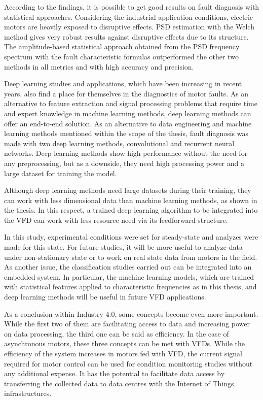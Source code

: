 According to the findings, it is possible to get good results on fault diagnosis with statistical approaches. Considering the industrial application conditions,  electric motors are heavily exposed to disruptive effects. PSD estimation with the Welch method gives very robust results against disruptive effects due to its structure. The amplitude-based statistical approach obtained from the PSD frequency spectrum with the fault characteristic formulas outperformed the other two methods in all metrics and with high accuracy and precision.

Deep learning studies and applications, which have been increasing in recent years, also find a place for themselves in the diagnostics of motor faults. As an alternative to feature extraction and signal processing problems that require time and expert knowledge in machine learning methods, deep learning methods can offer an end-to-end solution. As an alternative to data engineering and machine learning methods mentioned within the scope of the thesis, fault diagnosis was made with two deep learning methods, convolutional and recurrent neural networks. Deep learning methods show high performance without the need for any preprocessing, but as a downside, they need high processing power and a large dataset for training the model.

Although deep learning methods need large datasets during their training, they can work with less dimensional data than machine learning methods, as shown in the thesis. In this respect, a trained deep learning algorithm to be integrated into the VFD can work with less resource need via its feedforward structure.

In this study, experimental conditions were set for steady-state and analyzes were made for this state. For future studies, it will be more useful to analyze data under non-stationary state or to work on real state data from motors in the field. As another issue, the classification studies carried out can be integrated into an embedded system. In particular, the machine learning models, which are trained with statistical features applied to characteristic frequencies as in this thesis, and deep learning methods will be useful in future VFD applications.

As a conclusion within Industry 4.0, some concepts become even more important. While the first two of them are facilitating access to data and increasing power on data processing, the third one can be said as efficiency. In the case of asynchronous motors, these three concepts can be met with VFDs. While the efficiency of the system increases in motors fed with VFD, the current signal required for motor control can be used for condition monitoring studies without any additional expense. It has the potential to facilitate data access by transferring the collected data to data centres with the Internet of Things infrastructures.